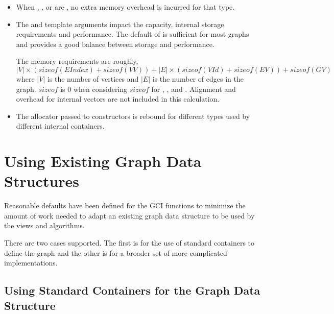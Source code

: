 \begin{itemdescr}
    \pnum\effects
        \begin{itemize}
            \item When , , or  are , no extra memory overhead is incurred for that type.
         \end{itemize}
    \pnum\remarks 
        \begin{itemize}
            \item  The  and  template arguments impact the capacity, internal storage requirements and performance.
                   The default of  is sufficient for most graphs and provides a good balance between storage and performance.

                   The memory requirements are roughly, 
                        \[|V| \times (sizeof(EIndex)+sizeof(VV)) + |E| \times (sizeof(VId) + sizeof(EV)) + sizeof(GV)\]
                   where $|V|$ is the number of vertices and $|E|$ is the number of edges in the graph. $sizeof$  is 0
                   when considering $sizeof$ for , , and . Alignment and overhead for internal vectors are 
                   not included in this calculation.
            \item The allocator passed to constructors is rebound for different types used by different internal containers.
        \end{itemize}
\end{itemdescr}

\section{Using Existing Graph Data Structures}
Reasonable defaults have been defined for the GCI functions to minimize the amount of work
needed to adapt an existing graph data structure to be used by the views and algorithms.

There are two cases supported. The first is for the use of standard containers to define the graph and the other
is for a broader set of more complicated implementations.

\subsection{Using Standard Containers for the Graph Data Structure}

